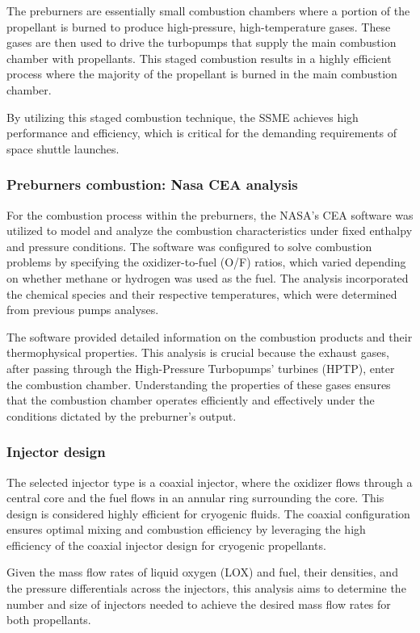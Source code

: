 The preburners are essentially small combustion chambers where a portion of the propellant is burned to produce high-pressure, high-temperature gases. These gases are then used to drive the turbopumps that supply the main combustion chamber with propellants.
This staged combustion results in a highly efficient process where the majority of the propellant is burned in the main combustion chamber.

By utilizing this staged combustion technique, the SSME achieves high performance and efficiency, which is critical for the demanding requirements of space shuttle launches.

\subsubsection{Preburners combustion: Nasa CEA analysis}
For the combustion process within the preburners, the NASA's CEA software was utilized to model and analyze the combustion characteristics under fixed enthalpy and pressure conditions. The software was configured to solve combustion problems by specifying the oxidizer-to-fuel (O/F) ratios, which varied depending on whether methane or hydrogen was used as the fuel. The analysis incorporated the chemical species and their respective temperatures, which were determined from previous pumps analyses.

 The software provided detailed information on the combustion products and their thermophysical properties. 
 This analysis is crucial because the exhaust gases, after passing through the High-Pressure Turbopumps' turbines (HPTP), enter the combustion chamber.
 Understanding the properties of these gases ensures that the combustion chamber operates efficiently and effectively under the conditions dictated by the preburner’s output.

\subsubsection{Injector design}
The selected injector type is a coaxial injector, where the oxidizer flows through a central core and the fuel flows in an annular ring surrounding the core. This design is considered highly efficient for cryogenic fluids. The coaxial configuration ensures optimal mixing and combustion efficiency by leveraging the high efficiency of the coaxial injector design for cryogenic propellants.

Given the mass flow rates of liquid oxygen (LOX) and fuel, their densities, and the pressure differentials across the injectors, this analysis aims to determine the number and size of injectors needed to achieve the desired mass flow rates for both propellants.

